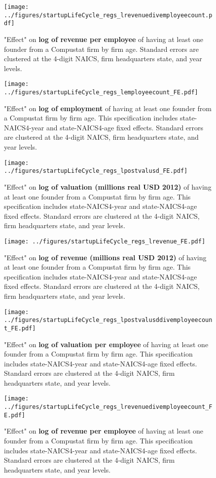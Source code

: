 \documentclass[12pt,english]{article}
\theoremstyle{remark}
\begin{document}
\begin{figure}
	\texttt{[image: ../figures/startupLifeCycle\_regs\_lrevenuedivemployeecount.pdf]}
	\caption{"Effect" on \textbf{log of revenue per employee} of having at least one founder from a Compustat firm by firm age. Standard errors are clustered at the 4-digit NAICS, firm headquarters state, and year levels.}
\end{figure}


\tiny


\begin{figure}
	\texttt{[image: ../figures/startupLifeCycle\_regs\_lemployeecount\_FE.pdf]}
	\caption{"Effect" on \textbf{log of employment} of having at least one founder from a Compustat firm by firm age. This specification includes state-NAICS4-year and state-NAICS4-age fixed effects. Standard errors are clustered at the 4-digit NAICS, firm headquarters state, and year levels.}
\end{figure}

\begin{figure}
	\texttt{[image: ../figures/startupLifeCycle\_regs\_lpostvalusd\_FE.pdf]}
	\caption{"Effect" on \textbf{log of valuation (millions real USD 2012)} of having at least one founder from a Compustat firm by firm age. This specification includes state-NAICS4-year and state-NAICS4-age fixed effects. Standard errors are clustered at the 4-digit NAICS, firm headquarters state, and year levels.}
\end{figure}

\begin{figure}
	\texttt{[image: ../figures/startupLifeCycle\_regs\_lrevenue\_FE.pdf]}
	\caption{"Effect" on \textbf{log of revenue (millions real USD 2012)} of having at least one founder from a Compustat firm by firm age. This specification includes state-NAICS4-year and state-NAICS4-age fixed effects. Standard errors are clustered at the 4-digit NAICS, firm headquarters state, and year levels.}
\end{figure}

\begin{figure}
	\texttt{[image: ../figures/startupLifeCycle\_regs\_lpostvalusddivemployeecount\_FE.pdf]}
	\caption{"Effect" on \textbf{log of valuation per employee} of having at least one founder from a Compustat firm by firm age. This specification includes state-NAICS4-year and state-NAICS4-age fixed effects. Standard errors are clustered at the 4-digit NAICS, firm headquarters state, and year levels.}
\end{figure}

\begin{figure}
	\texttt{[image: ../figures/startupLifeCycle\_regs\_lrevenuedivemployeecount\_FE.pdf]}
	\caption{"Effect" on \textbf{log of revenue per employee} of having at least one founder from a Compustat firm by firm age. This specification includes state-NAICS4-year and state-NAICS4-age fixed effects. Standard errors are clustered at the 4-digit NAICS, firm headquarters state, and year levels.}
\end{figure}
\end{document}
